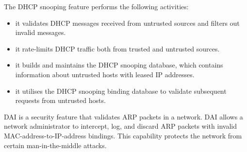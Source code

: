 The \ac{DHCP} snooping feature performs the following activities:
\begin{itemize}
\item it validates \acs{DHCP} messages received from untrusted sources and filters out invalid messages.
\item it rate-limits \acs{DHCP} traffic both from trusted and untrusted sources.
\item it builds and maintains the \acs{DHCP} snooping database, which contains information about untrusted hosts with leased \acs{IP} addresses.
\item it utilises the \acs{DHCP} snooping binding database to validate subsequent requests from untrusted hosts.
\end{itemize}

\Acf{DAI} is a security feature that validates \acs{ARP} packets in a network.
\Acl{DAI} allows a network administrator to intercept, log, and discard \ac{ARP} packets with invalid \acs{MAC}-address-to-\acs{IP}-address bindings.
This capability protects the network from certain man-in-the-middle attacks.


